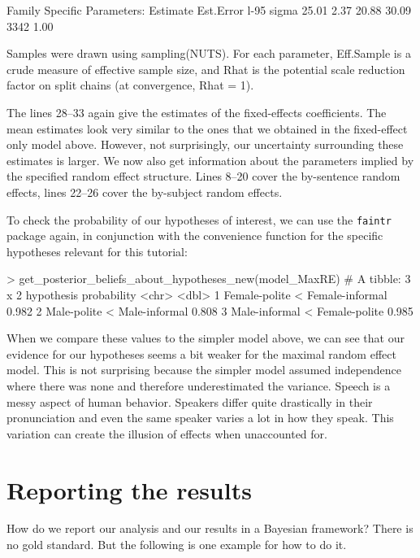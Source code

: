 \documentclass[nobib]{tufte-handout}
\begin{document}
\begin{minipage}[]{1.5\textwidth}
\begin{rc}
Family Specific Parameters: 
      Estimate Est.Error l-95%
sigma    25.01      2.37    20.88    30.09       3342 1.00

Samples were drawn using sampling(NUTS). For each parameter, Eff.Sample 
is a crude measure of effective sample size, and Rhat is the potential 
scale reduction factor on split chains (at convergence, Rhat = 1).
\end{rc}
\end{minipage}

The lines 28--33 again give the estimates of the fixed-effects coefficients. The mean estimates look very similar to the ones that we obtained in the fixed-effect only model above. However, not surprisingly, our uncertainty surrounding these estimates is larger.  
We now also get information about the parameters implied by the specified random effect
structure. Lines 8--20 cover the by-sentence random effects, lines 22--26 cover the by-subject
random effects.

To check the probability of our hypotheses of interest, we can use the \texttt{faintr} package again, in conjunction with the convenience function for the specific hypotheses relevant for this tutorial:

\medskip

\begin{minipage}[]{\textwidth}
\begin{rc}
> get_posterior_beliefs_about_hypotheses_new(model_MaxRE)
# A tibble: 3 x 2
  hypothesis                      probability
  <chr>                                 <dbl>
1 Female-polite < Female-informal       0.982
2 Male-polite < Male-informal           0.808
3 Male-informal < Female-polite         0.985
\end{rc}
\end{minipage}

When we compare these values to the simpler model above, we can see that our evidence for our
hypotheses seems a bit weaker for the maximal random effect model. This is not surprising
because the simpler model assumed independence where there was none and therefore
underestimated the variance. Speech is a messy aspect of human behavior. Speakers differ quite
drastically in their pronunciation and even the same speaker varies a lot in how they speak.
This variation can create the illusion of effects when unaccounted for.

\section{Reporting the results}
How do we report our analysis and our results in a Bayesian framework? There is no gold
standard. But the following is one example for how to do it.
\end{document}
